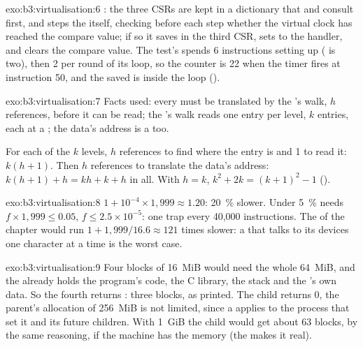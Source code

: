 \begin{solution}{exo:b3:virtualisation:6}
: the three CSRs are kept in a dictionary that  and  consult first, and  steps the  itself, checking before each step whether the virtual clock has reached the compare value; if so it saves  in the third CSR, sets  to the handler, and clears the compare value. The test's  spends 6 instructions setting up ( is two), then 2 per round of its loop, so the counter is 22 when the timer fires at instruction 50, and the saved  is inside the loop ().
\end{solution}

\begin{solution}{exo:b3:virtualisation:7}
Facts used: every   must be translated by the 's walk, $h$ references, before it can be read; the 's walk reads one entry per level, $k$ entries, each at a  ; the data's address is a   too.

For each of the $k$  levels, $h$ references to find where the entry is and 1 to read it: $k(h + 1)$. Then $h$ references to translate the data's address: $k(h + 1) + h = kh + k + h$ in all. With $h = k$, $k^2 + 2k = (k + 1)^2 - 1$ ().
\end{solution}

\begin{solution}{exo:b3:virtualisation:8}
$1 + 10^{-4} \times 1{,}999 \approx 1.20$: 20~\% slower. Under 5~\% needs $f \times 1{,}999 \le 0.05$, $f \le 2.5 \times 10^{-5}$: one trap every 40,000 instructions. The  of the chapter would run $1 + 1{,}999/16.6 \approx 121$ times slower: a  that talks to its devices one character at a time is the worst case.
\end{solution}

\begin{solution}{exo:b3:virtualisation:9}
Four blocks of 16~MiB would need the whole 64~MiB, and the  already holds the program's code, the C library, the stack and the 's own data. So the fourth  returns : three blocks, as printed. The child returns 0, the parent's allocation of 256~MiB is not limited, since a  applies to the process that set it and its future children. With 1~GiB the child would get about 63 blocks, by the same reasoning, if the machine has the memory (the  makes it real).
\end{solution}


